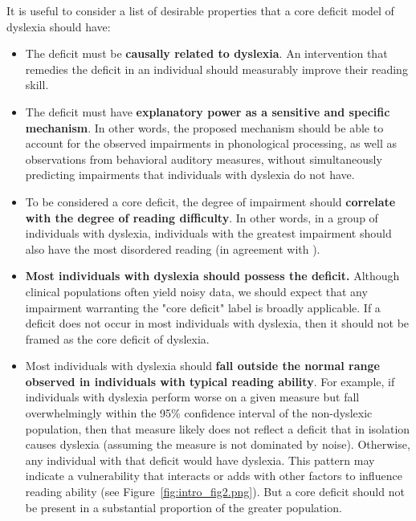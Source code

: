 \documentclass[../uwthesis.tex]{subfiles}
\begin{document}
It is useful to consider a list of desirable properties that a core deficit model of dyslexia should have:
\begin{itemize}
    \item The deficit must be \textbf{causally related to dyslexia}. An intervention that remedies the deficit in an individual should measurably improve their reading skill.
    \item The deficit must have \textbf{explanatory power as a sensitive and specific mechanism}. In other words, the proposed mechanism should be able to account for the observed impairments in phonological processing, as well as observations from behavioral auditory measures, without simultaneously predicting impairments that individuals with dyslexia do not have.
    \item To be considered a core deficit, the degree of impairment should \textbf{correlate with the degree of reading difficulty}. In other words, in a group of individuals with dyslexia, individuals with the greatest impairment should also have the most disordered reading (in agreement with \citep{Rosen2003}).
    \item \textbf{Most individuals with dyslexia should possess the deficit.} Although clinical populations often yield noisy data, we should expect that any impairment warranting the "core deficit" label is broadly applicable. If a deficit does not occur in most individuals with dyslexia, then it should not be framed as the core deficit of dyslexia.
    \item Most individuals with dyslexia should \textbf{fall outside the normal range observed in individuals with typical reading ability}. For example, if individuals with dyslexia perform worse on a given measure but fall overwhelmingly within the 95\% confidence interval of the non-dyslexic population, then that measure likely does not reflect a deficit that in isolation causes dyslexia \citep{Ramus2003} (assuming the measure is not dominated by noise). Otherwise, any individual with that deficit would have dyslexia. This pattern may indicate a vulnerability that interacts or adds with other factors to influence reading ability (see Figure~\ref{fig:intro_fig2.png}). But a core deficit should not be present in a substantial proportion of the greater population.
\end{itemize}
 
\end{document}
